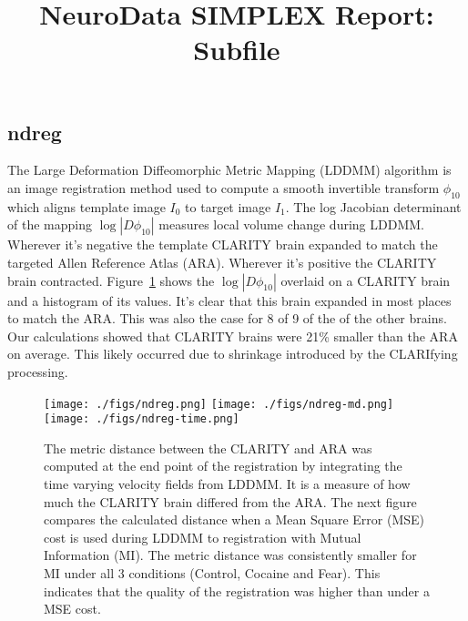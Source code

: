 \documentclass[simplex.tex]{subfiles}
\title{NeuroData SIMPLEX Report: Subfile}
\begin{document}


\subsection{ndreg}

The Large Deformation Diffeomorphic Metric Mapping (LDDMM) algorithm is
an image registration method used to compute a smooth invertible
transform $\phi_{10}$ which aligns template image $I_0$ to target
image $I_1$. The log Jacobian determinant of the mapping $\log
|D\phi_{10}|$ measures local volume change during LDDMM.  Wherever it’s
negative the template CLARITY brain expanded to match the targeted Allen
Reference Atlas (ARA).  Wherever it’s positive the CLARITY brain
contracted.  Figure~\ref{fig:ndreg} shows the $\log |D\phi_{10}|$ overlaid
on a CLARITY brain and a histogram of its values.  It’s clear that this
brain expanded in most places to match the ARA.  This was also the case
for 8 of 9 of the of the other brains.  Our calculations showed that
CLARITY brains were 21\% smaller than the ARA on average.  This likely
occurred due to shrinkage introduced by the CLARIfying processing.


\begin{figure}[h!]
\begin{cframed}
\centering
\texttt{[image: ./figs/ndreg.png]}
\texttt{[image: ./figs/ndreg-md.png]}\\
\texttt{[image: ./figs/ndreg-time.png]}
\caption{
  The metric distance between the CLARITY and ARA was computed at the
  end point of the registration by integrating the time varying velocity
  fields from LDDMM.  It is a measure of how much the CLARITY brain
  differed from the ARA. The next figure compares the calculated
  distance when a Mean Square Error (MSE) cost is used during LDDMM to
  registration with Mutual Information (MI).  The metric distance was
  consistently smaller for MI under all 3 conditions (Control, Cocaine
  and Fear).  This indicates that the quality of the registration was
  higher than under a MSE cost.
}
\label{fig:ndreg}
\end{cframed}
\end{figure}
\end{document}
